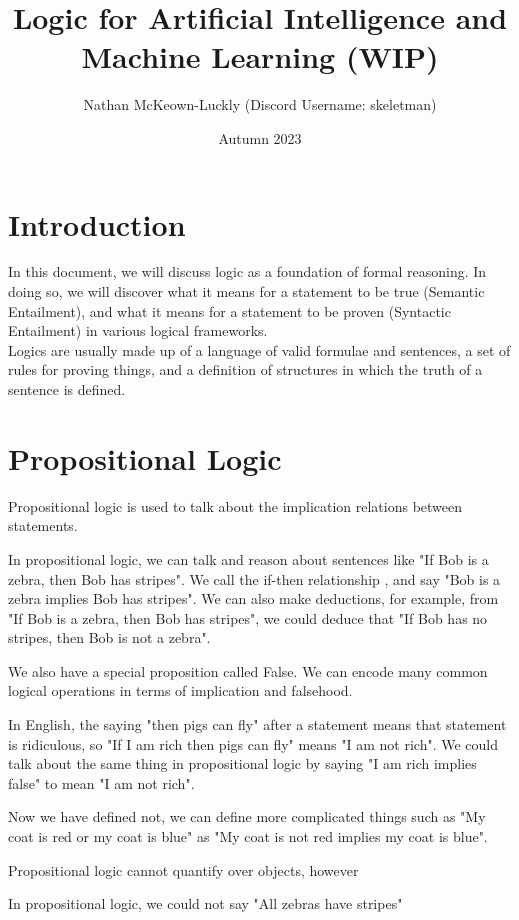 \documentclass[11pt]{article}
\title{Logic for Artificial Intelligence and Machine Learning (WIP)}
\date{Autumn 2023}
\author{Nathan McKeown-Luckly (Discord Username: skeletman)}
\begin{document}
\maketitle
\tableofcontents
\pagebreak
\section{Introduction}
In this document, we will discuss logic as a foundation of formal reasoning. In doing so, we will discover what it means for a statement to be true (Semantic Entailment), and what it means for a statement to be proven (Syntactic Entailment) in various logical frameworks.
\\ Logics are usually made up of a language of valid formulae and sentences, a set of rules for proving things, and a definition of structures in which the truth of a sentence is defined.
\section{Propositional Logic}
Propositional logic is used to talk about the implication relations between statements.
\begin{eg}
    In propositional logic, we can talk and reason about sentences like "If Bob is a zebra, then Bob has stripes". We call the if-then relationship , and say "Bob is a zebra implies Bob has stripes". We can also make deductions, for example, from "If Bob is a zebra, then Bob has stripes", we could deduce that "If Bob has no stripes, then Bob is not a zebra".
\end{eg}
We also have a special proposition called False. We can encode many common logical operations in terms of implication and falsehood. 
\begin{eg} 
    In English, the saying "then pigs can fly" after a statement means that statement is ridiculous, so "If I am rich then pigs can fly" means "I am not rich". We could talk about the same thing in propositional logic by saying "I am rich implies false" to mean "I am not rich".
\end{eg}
\begin{eg}
    Now we have defined not, we can define more complicated things such as "My coat is red or my coat is blue" as "My coat is not red implies my coat is blue".
\end{eg}
Propositional logic cannot quantify over objects, however
\begin{eg}
    In propositional logic, we could not say "All zebras have stripes"
\end{eg}
\pagebreak
\end{document}
